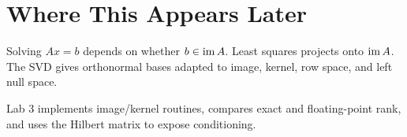 \section*{Where This Appears Later}

Solving $Ax=b$ depends on whether $b\in\operatorname{im} A$. Least squares projects onto
$\operatorname{im} A$. The SVD gives orthonormal bases adapted to image, kernel, row space,
and left null space.

\begin{labbox}
Lab 3 implements image/kernel routines, compares exact and floating-point rank,
and uses the Hilbert matrix to expose conditioning.
\end{labbox}


